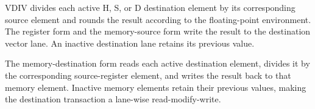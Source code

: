VDIV divides each active H, S, or D destination element by its corresponding
source element and rounds the result according to the floating-point
environment. The register form and the memory-source form write the result to
the destination vector lane. An inactive destination lane retains its
previous value.

The memory-destination form reads each active destination element, divides it
by the corresponding source-register element, and writes the result back to
that memory element. Inactive memory elements retain their previous values,
making the destination transaction a lane-wise read-modify-write.

